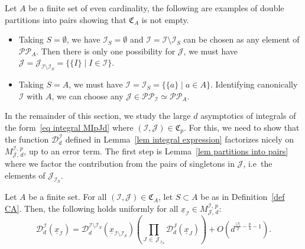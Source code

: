 \documentclass[AHL,Unicode,longabstracts,published]{cedram}
\newcommand{\D}{\mathcal{D}}
\newcommand{\I}{\mathcal{I}}
\newcommand{\J}{\mathcal{J}}
\newcommand{\frkC}{\mathfrak{C}}
\newcommand{\pp}{\mathcal{P\!P}\!}
\newcommand{\norm}[1]{\left\lvert #1 \right\rvert}
\begin{document}
\begin{exam}\label{ex CA}
Let $A$ be a finite set of even cardinality, the following are examples of double partitions into pairs showing that $\frkC_A$ is not empty.
\begin{itemize}
\item Taking $S = \emptyset$, we have $\I_S = \emptyset$ and $\I = \I \setminus \I_S$ can be chosen as any element of $\pp_A$. Then there is only one possibility for $\J$, we must have $\J = \J_{\I \setminus \I_S} = \{\{I\} \mid I \in \I\}$.
\item Taking $S = A$, we must have $\I = \I_S = \{\{a\} \mid a \in A\}$. Identifying canonically $\I$ with $A$, we can choose any $\J \in \pp_\I \simeq \pp_A$.
\end{itemize}
\end{exam}

In the remainder of this section, we study the large $d$ asymptotics of integrals of the form~\eqref{eq integral MIpJd} where $(\I,\J) \in \frkC_p$. For this, we need to show that the function $\D_d^\I$ defined in Lemma~\ref{lem integral expression} factorizes nicely on $M^{\I,\,p}_{\J,\,d}$, up to an error term. The first step is Lemma~\ref{lem partitions into pairs} where we factor the contribution from the pairs of singletons in $\J$, i.e~the elements of $\J_{\I_S}$.

\begin{lemm}\label{lem partitions into pairs}
Let $A$ be a finite set. For all $(\I,\J) \in \frkC_A$, let $S \subset A$ be as in Definition~\ref{def CA}. Then, the following holds uniformly for all $\underline{x}_\I \in M^{\I,\,p}_{\J,\,d}$:
\[
\D_d^\I\left(\underline{x}_\I\right) = \D_d^{\I \setminus \I_S}\left(\underline{x}_{\I \setminus \I_S}\right) \left(\prod_{J \,\in\,\J_{\I_S}}\D_d^J\left(\underline{x}_J\right)\right) +O\left(d^{\frac{\norm{\I}}{2}-\frac{p}{4}-1}\right).
\]
\end{lemm}
\end{document}
